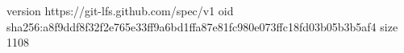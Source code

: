 version https://git-lfs.github.com/spec/v1
oid sha256:a8f9ddf8f32f2e765e33ff9a6bd1ffa87e81fc980e073ffc18fd03b05b3b5af4
size 1108
